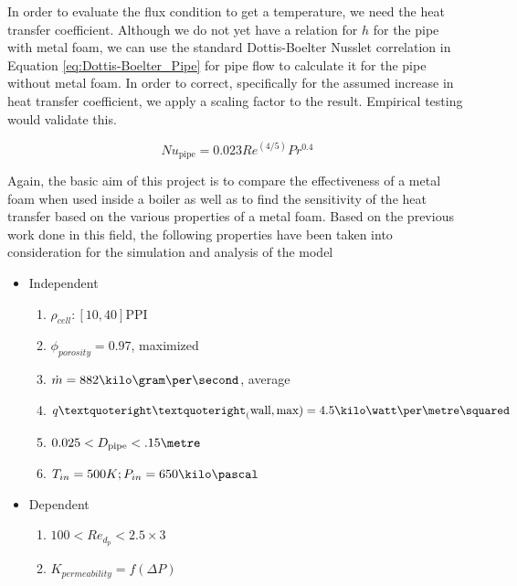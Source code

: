 \documentclass[compileTAMUreport.tex]{subfiles}
\begin{document}
In order to evaluate the flux condition to get a temperature, we need the heat transfer coefficient. Although we do not yet have a relation for $h$ for the pipe with metal foam, we can use the standard Dottis-Boelter Nusslet correlation in Equation \ref{eq:Dottis-Boelter_Pipe} for pipe flow to calculate it for the pipe without metal foam. In order to correct, specifically for the assumed increase in heat transfer coefficient, we apply a scaling factor to the result. Empirical testing would validate this.

\begin{equation} \label{eq:Dottis-Boelter_Pipe}
Nu_{\mathrm{pipe}} = 0.023 Re^{(4/5)} Pr^{0.4}
\end{equation}
%


Again, the basic aim of this project is to compare the effectiveness of a metal foam when used inside a boiler as well as to find the sensitivity of the heat transfer based on the various properties of a metal foam. Based on the previous work done in this field, the following properties have been taken into consideration for the simulation and analysis of the model


\begin{itemize}
	\item Independent
		\begin{enumerate}
			\item $\rho_{cell} : [10,40] \mathrm{PPI}$
			\item $\phi_{porosity}= 0.97$, maximized
			\item $\dot{m} = 882 \kilo\gram\per\second$, average
			\item $ q’’_(\mathrm{wall,max}) = 4.5 \kilo\watt\per\metre\squared$
			\item $ 0.025 < D_{\mathrm{pipe}} < .15 \metre$
			\item $ T_{in}=500 K ;P_{in} = 650 \kilo\pascal $
		\end{enumerate}
	\item Dependent
		\begin{enumerate}
			\item $100 < Re_{d_p} < 2.5 \times 3$
			\item $K_{permeability}= f(\Delta P)$
		\end{enumerate}
\end{itemize}
\end{document}
